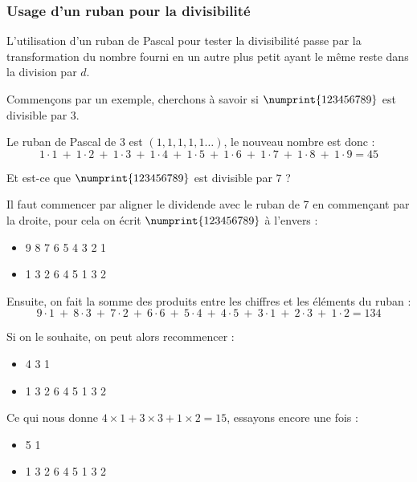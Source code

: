\documentclass[a4paper]{article}
\begin{document}
\vfill



\subsubsection*{Usage d’un ruban pour la divisibilité}\label{usage_ruban}
	L'utilisation d'un ruban de Pascal pour tester la divisibilité passe par la transformation du nombre fourni en un autre plus petit ayant le même reste dans la division par $d$.
	
	Commençons par un exemple, cherchons à savoir si $\numprint{123456789}$ est divisible par $3$.
	
	Le ruban de Pascal de $3$ est $(1, 1, 1, 1, 1\dots)$, le nouveau nombre est donc :
	\vspace{-1 mm}
	$$1 \cdot 1~+~1 \cdot 2~+~1 \cdot 3~+~1 \cdot 4~+~1 \cdot 5~+~1 \cdot 6~+~1 \cdot 7~+~1 \cdot 8~+~1 \cdot 9 = 45$$

\vfill

\pagebreak




	Et est-ce que $\numprint{123456789}$ est divisible par $7$ ?
	
	Il faut commencer par aligner le dividende avec le ruban de 7 en commençant par la droite, pour cela on écrit $\numprint{123456789}$ à l'envers :
	
\begin{itemize}
	\item[] 9 8 7 6 5 4 3 2 1 
    \item[] 1 3 2 6 4 5 1 3 2
\end{itemize}	
	
    
Ensuite, on fait la somme des produits entre les chiffres et les éléments du ruban :
$$9 \cdot 1~+~8 \cdot 3~+~7 \cdot 2~+~6 \cdot 6~+~5 \cdot 4~+~4 \cdot 5~+~3 \cdot 1~+~2 \cdot 3~+~1 \cdot 2 = 134$$

Si on le souhaite, on peut alors recommencer :

\begin{itemize}
	\item[] 4 3 1 
    \item[] 1 3 2 6 4 5 1 3 2\\
\end{itemize}

Ce qui nous donne $ 4\times1 + 3\times3 + 1\times2 = 15 $, essayons encore une fois :

\begin{itemize}
	\item[] 5 1
    \item[] 1 3 2 6 4 5 1 3 2\\
\end{itemize}
\end{document}
